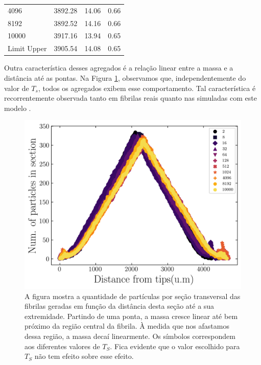 \documentclass[11pt,a4paper]{article} %
\begin{document}
\begin{table}[H]
\begin{tabular}{lccc}
            4096             & 3892.28                                   & 14.06             & 0.66                  \\
            8192             & 3892.52                                   & 14.16             & 0.66                  \\
            10000            & 3917.16                                   & 13.94             & 0.65                  \\ \hline
            \multicolumn{1}{l}{Limit Upper} & 3905.54                    & 14.08             & 0.65                  \\ \hline
            \end{tabular}
            \label{tab1}  %
        \end{table}
    

        Outra característica desses agregados é a relação linear entre a massa e a distância até as pontas. Na Figura  
        \ref{R2}, observamos que, independentemente do valor de \(T_{s}\), todos os agregados exibem esse comportamento.  
        Tal característica é recorrentemente observada tanto em fibrilas reais quanto nas simuladas com este modelo  
        \cite{Parkinson1995,Kadler1987}.  

     
        \begin{figure}[H] 

            \centering 
            \includegraphics[width=\textwidth]{figures/tips.png} 
            \caption{A figura mostra a quantidade de partículas por seção transversal das fibrilas geradas em função da  
            distância desta seção até a sua extremidade. Partindo de uma ponta, a massa cresce linear até bem próximo  
            da região central da fibrila. À medida que nos afastamos dessa região, a massa decaí linearmente. Os símbolos  
            correspondem aos diferentes valores de $T_{S}$. Fica evidente que o valor escolhido para $T_{S}$ não tem  
            efeito sobre esse efeito.}
            \label{R2} 

        \end{figure} 
\end{document}

